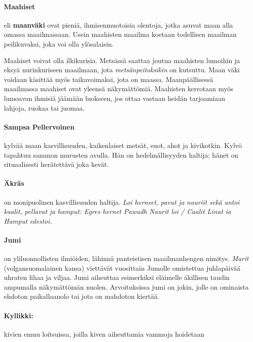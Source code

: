   \paragraph{Maahiset} eli \textbf{maanväki} ovat pieniä, ihmisenmuotoisia olentoja, jotka asuvat
    maan alla omassa maailmassaan. Usein maahisten maailma koetaan todellisen maailman
    peilikuvaksi, joka voi olla ylösalaisin. \par
    Maahiset voivat olla ilkikurisia. Metsässä saattaa joutua maahisten lumoihin ja eksyä
    nurinkuriseen maailmaan, jota \emph{metsänpeitoksikin} on kutsuttu. Maan väki voidaan käsittää
    myös taikavoimaksi, jota on maassa. Maanpäällisessä maailmassa maahiset ovat yleensä
    näkymättömiä. Maahisten kerrotaan myös lumoavan ihmisiä jäämään luokseen, jos ottaa vastaan
    heidän tarjoamiaan lahjoja, ruokaa tai juomaa.
  \paragraph{Sampsa Pellervoinen} kylvää maan kasvillisuuden, kaikenlaiset metsät, suot, ahot ja
    kivikotkin. Kylvö tapahtuu sammon murusten avulla. Hän on hedelmällisyyden haltija; hänet on
    rituaalisesti herätettävä joka kevät.
  \paragraph{Äkräs} on monipuolinen kasvillisuuden haltija. \emph{Loi herneet, pavut ja nauriit
    sekä antoi kaalit, pellavat ja hamput: Egres hernet Pawudh Naurit loi / Caalit Linat ia Hamput
    edestoi.}
  \paragraph{Jumi} on yliluonnollisten ilmiöiden, lähinnä panteistisen maailmanhengen nimitys.
    \emph{Marit} (volgansuomalainen kansa) viettävät vuosittain Jumolle omistettua juhlapäivää
    uhraten lihaa ja viljaa. Jumi aiheuttaa esimerkiksi eläimelle äkillisen taudin ampumalla
    näkymättömän nuolen. Arvoituksissa jumi on jokin, jolle on ominaista ehdoton paikallaanolo
    tai jota on mahdoton kiertää.

    \paragraph{Kyllikki:} kivien emuu loitsuissa, joilla kiven aiheuttamia vammoja hoidetaan
